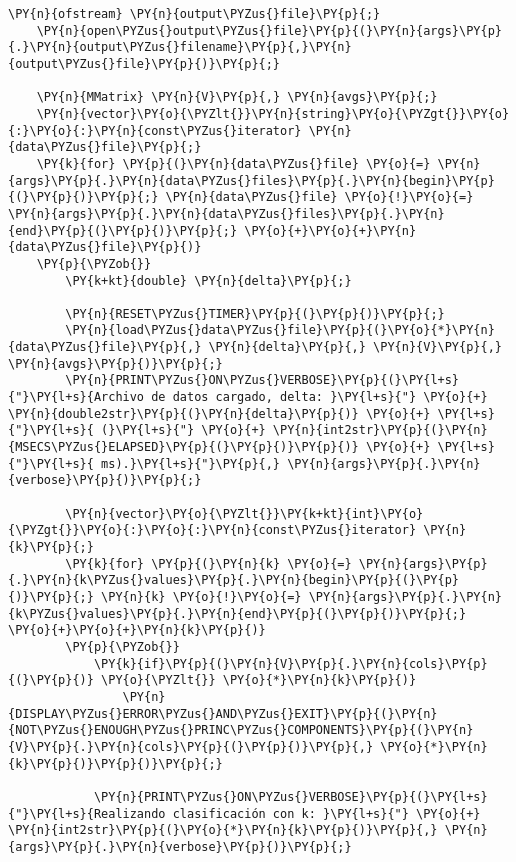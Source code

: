 \begin{Verbatim}[commandchars=\\\{\}]
	\PY{n}{ofstream} \PY{n}{output\PYZus{}file}\PY{p}{;}
	\PY{n}{open\PYZus{}output\PYZus{}file}\PY{p}{(}\PY{n}{args}\PY{p}{.}\PY{n}{output\PYZus{}filename}\PY{p}{,}\PY{n}{output\PYZus{}file}\PY{p}{)}\PY{p}{;}

	\PY{n}{MMatrix} \PY{n}{V}\PY{p}{,} \PY{n}{avgs}\PY{p}{;}
	\PY{n}{vector}\PY{o}{\PYZlt{}}\PY{n}{string}\PY{o}{\PYZgt{}}\PY{o}{:}\PY{o}{:}\PY{n}{const\PYZus{}iterator} \PY{n}{data\PYZus{}file}\PY{p}{;}
	\PY{k}{for} \PY{p}{(}\PY{n}{data\PYZus{}file} \PY{o}{=} \PY{n}{args}\PY{p}{.}\PY{n}{data\PYZus{}files}\PY{p}{.}\PY{n}{begin}\PY{p}{(}\PY{p}{)}\PY{p}{;} \PY{n}{data\PYZus{}file} \PY{o}{!}\PY{o}{=} \PY{n}{args}\PY{p}{.}\PY{n}{data\PYZus{}files}\PY{p}{.}\PY{n}{end}\PY{p}{(}\PY{p}{)}\PY{p}{;} \PY{o}{+}\PY{o}{+}\PY{n}{data\PYZus{}file}\PY{p}{)}
	\PY{p}{\PYZob{}}
		\PY{k+kt}{double} \PY{n}{delta}\PY{p}{;}

		\PY{n}{RESET\PYZus{}TIMER}\PY{p}{(}\PY{p}{)}\PY{p}{;}
		\PY{n}{load\PYZus{}data\PYZus{}file}\PY{p}{(}\PY{o}{*}\PY{n}{data\PYZus{}file}\PY{p}{,} \PY{n}{delta}\PY{p}{,} \PY{n}{V}\PY{p}{,} \PY{n}{avgs}\PY{p}{)}\PY{p}{;}
		\PY{n}{PRINT\PYZus{}ON\PYZus{}VERBOSE}\PY{p}{(}\PY{l+s}{"}\PY{l+s}{Archivo de datos cargado, delta: }\PY{l+s}{"} \PY{o}{+} \PY{n}{double2str}\PY{p}{(}\PY{n}{delta}\PY{p}{)} \PY{o}{+} \PY{l+s}{"}\PY{l+s}{ (}\PY{l+s}{"} \PY{o}{+} \PY{n}{int2str}\PY{p}{(}\PY{n}{MSECS\PYZus{}ELAPSED}\PY{p}{(}\PY{p}{)}\PY{p}{)} \PY{o}{+} \PY{l+s}{"}\PY{l+s}{ ms).}\PY{l+s}{"}\PY{p}{,} \PY{n}{args}\PY{p}{.}\PY{n}{verbose}\PY{p}{)}\PY{p}{;}

		\PY{n}{vector}\PY{o}{\PYZlt{}}\PY{k+kt}{int}\PY{o}{\PYZgt{}}\PY{o}{:}\PY{o}{:}\PY{n}{const\PYZus{}iterator} \PY{n}{k}\PY{p}{;}
		\PY{k}{for} \PY{p}{(}\PY{n}{k} \PY{o}{=} \PY{n}{args}\PY{p}{.}\PY{n}{k\PYZus{}values}\PY{p}{.}\PY{n}{begin}\PY{p}{(}\PY{p}{)}\PY{p}{;} \PY{n}{k} \PY{o}{!}\PY{o}{=} \PY{n}{args}\PY{p}{.}\PY{n}{k\PYZus{}values}\PY{p}{.}\PY{n}{end}\PY{p}{(}\PY{p}{)}\PY{p}{;} \PY{o}{+}\PY{o}{+}\PY{n}{k}\PY{p}{)}
		\PY{p}{\PYZob{}}
			\PY{k}{if}\PY{p}{(}\PY{n}{V}\PY{p}{.}\PY{n}{cols}\PY{p}{(}\PY{p}{)} \PY{o}{\PYZlt{}} \PY{o}{*}\PY{n}{k}\PY{p}{)}
				\PY{n}{DISPLAY\PYZus{}ERROR\PYZus{}AND\PYZus{}EXIT}\PY{p}{(}\PY{n}{NOT\PYZus{}ENOUGH\PYZus{}PRINC\PYZus{}COMPONENTS}\PY{p}{(}\PY{n}{V}\PY{p}{.}\PY{n}{cols}\PY{p}{(}\PY{p}{)}\PY{p}{,} \PY{o}{*}\PY{n}{k}\PY{p}{)}\PY{p}{)}\PY{p}{;}

			\PY{n}{PRINT\PYZus{}ON\PYZus{}VERBOSE}\PY{p}{(}\PY{l+s}{"}\PY{l+s}{Realizando clasificación con k: }\PY{l+s}{"} \PY{o}{+} \PY{n}{int2str}\PY{p}{(}\PY{o}{*}\PY{n}{k}\PY{p}{)}\PY{p}{,} \PY{n}{args}\PY{p}{.}\PY{n}{verbose}\PY{p}{)}\PY{p}{;}


\end{Verbatim}
